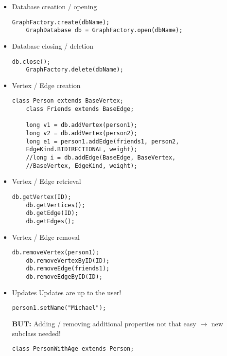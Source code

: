 \begin{itemize}

	\item Database creation / opening	
	\begin{lstlisting}[caption=(Creating / opening a DB)]
	GraphFactory.create(dbName);
	GraphDatabase db = GraphFactory.open(dbName);
	\end{lstlisting}

	\item Database closing / deletion
	\begin{lstlisting}[caption=(Closing / deleting a DB)]
	db.close();
	GraphFactory.delete(dbName);
	\end{lstlisting}

	\item Vertex / Edge creation
	\begin{lstlisting}[caption=(Vertex / Edge creation)]
	class Person extends BaseVertex;
	class Friends extends BaseEdge;

	long v1 = db.addVertex(person1);
	long v2 = db.addVertex(person2);
	long e1 = person1.addEdge(friends1, person2, 
	EdgeKind.BIDIRECTIONAL, weight);
	//long i = db.addEdge(BaseEdge, BaseVertex, 
	//BaseVertex, EdgeKind, weight);
	\end{lstlisting}

	\item Vertex / Edge retrieval
	\begin{lstlisting}[caption=(Vertex / Edge retrieval)]
	db.getVertex(ID);
	db.getVertices();
	db.getEdge(ID);
	db.getEdges();
	\end{lstlisting}

	\item Vertex / Edge removal
	\begin{lstlisting}[caption=(Vertex / Edge removal)]
	db.removeVertex(person1);
	db.removeVertexByID(ID);
	db.removeEdge(friends1);
	db.removeEdgeByID(ID);
	\end{lstlisting}

	\item Updates
	Updates are up to the user!

	\begin{lstlisting}[caption=(User defined update method)]
	person1.setName("Michael");
	\end{lstlisting}

	\textbf{BUT:} Adding / removing additional properties not that easy 	$\rightarrow$ new subclass needed!
	\begin{lstlisting}[caption=(Subclass of Person with additional "age" property)]	
	class PersonWithAge extends Person;


\end{lstlisting}
\end{itemize}
